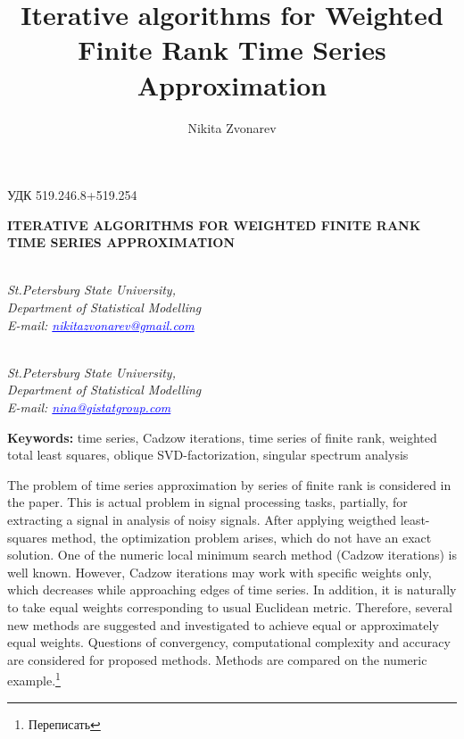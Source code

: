 \documentclass[12pt,a4paper,fleqn,leqno]{article}
\author{Nikita Zvonarev}
\title{Iterative algorithms for Weighted Finite Rank Time Series  Approximation}
\begin{document}
\noindent УДК 519.246.8+519.254

\begin{center}{
\fontsize{18pt}{23pt}\selectfont\bf%
  \MakeUppercase{
 Iterative algorithms for Weighted Finite Rank Time Series Approximation
}}
\end{center}

\begin{center}{\bpv{}\\
\footnotesize\it St.Petersburg State University,\\
Department of Statistical Modelling
\\
\rm
E-mail: \textcolor {blue}{\underline{nikitazvonarev@gmail.com}}}
\end{center}
\begin{center}{\\
\footnotesize\it St.Petersburg State University,\\
Department of Statistical Modelling
\\
\rm
E-mail: \textcolor {blue}{\underline{nina@gistatgroup.com}}}
\end{center}
\hspace{1.25cm}\begin{minipage}{12.16cm}\bpv\bpv\bmv \noindent
\footnotesize{\bf Keywords:}\/ time series, Cadzow iterations, time series of finite rank, weighted total least squares, oblique SVD-factorization, singular spectrum analysis

\bpv\bpv\noindent  The problem of time series approximation by series of finite rank is considered in the paper. This is actual problem in signal processing tasks, partially, for extracting a signal in analysis of noisy signals. After applying weigthed least-squares method, the optimization problem arises, which do not have an exact solution. One of the numeric local minimum search method (Cadzow iterations) is well known. However, Cadzow iterations may work with specific weights only, which decreases while approaching edges of time series. In addition, it is naturally to take equal weights corresponding to usual Euclidean metric. Therefore, several new methods are suggested and investigated to achieve equal or approximately equal weights. Questions of convergency, computational complexity and accuracy are considered for proposed methods. Methods are compared on the numeric example.\footnote{Переписать}

\end{minipage}\bls\bmv
\end{document}
